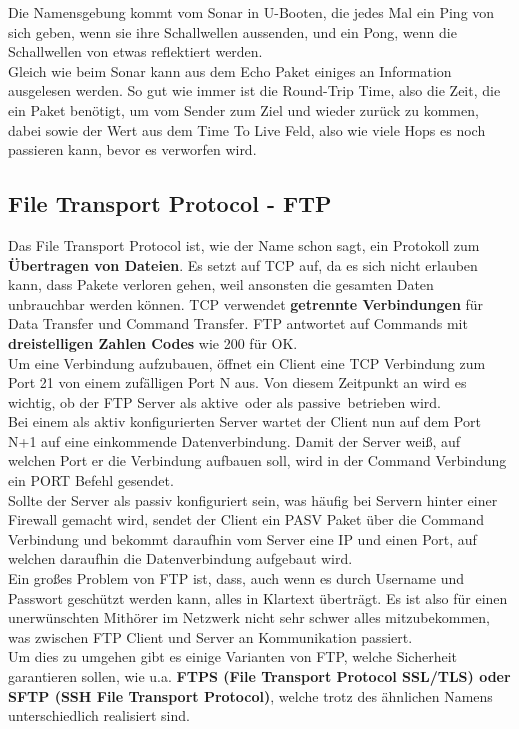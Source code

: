 \documentclass[12pt,a4paper]{report}
\begin{document}
Die Namensgebung kommt vom Sonar in U-Booten, die jedes Mal ein Ping von sich geben, wenn sie ihre Schallwellen aussenden, und ein Pong, wenn die Schallwellen von etwas reflektiert werden.\\ 
Gleich wie beim Sonar kann aus dem Echo Paket einiges an Information ausgelesen werden. So gut wie immer ist die Round-Trip Time, also die Zeit, die ein Paket benötigt, um vom Sender zum Ziel und wieder zurück zu kommen, dabei sowie der Wert aus dem Time To Live Feld, also wie viele Hops es noch passieren kann, bevor es verworfen wird.
\subsection{File Transport Protocol - FTP}
Das File Transport Protocol ist, wie der Name schon sagt, ein Protokoll zum \textbf{Übertragen von Dateien}. Es setzt auf TCP auf, da es sich nicht erlauben kann, dass Pakete verloren gehen, weil ansonsten die gesamten Daten unbrauchbar werden können. TCP verwendet \textbf{getrennte Verbindungen} für Data Transfer und Command Transfer. FTP antwortet auf Commands mit \textbf{dreistelligen Zahlen Codes} wie 200 für OK.\\

Um eine Verbindung aufzubauen, öffnet ein Client eine TCP Verbindung zum Port 21 von einem zufälligen Port N aus. Von diesem Zeitpunkt an wird es wichtig, ob der FTP Server als \glqq aktive\grqq \ oder als \glqq passive\grqq \ betrieben wird.\\
Bei einem als aktiv konfigurierten Server wartet der Client nun auf dem Port N+1 auf eine einkommende Datenverbindung. Damit der Server weiß, auf welchen Port er die Verbindung aufbauen soll, wird in der Command Verbindung ein PORT Befehl gesendet.\\
Sollte der Server als passiv konfiguriert sein, was häufig bei Servern hinter einer Firewall gemacht wird, sendet der Client ein PASV Paket über die Command Verbindung und bekommt daraufhin vom Server eine IP und einen Port, auf welchen daraufhin die Datenverbindung aufgebaut wird.\\

Ein großes Problem von FTP ist, dass, auch wenn es durch Username und Passwort geschützt werden kann, alles in Klartext überträgt. Es ist also für einen unerwünschten Mithörer im Netzwerk nicht sehr schwer alles mitzubekommen, was zwischen FTP Client und Server an Kommunikation passiert.\\
Um dies zu umgehen gibt es einige Varianten von FTP, welche Sicherheit garantieren sollen, wie u.a. \textbf{FTPS (File Transport Protocol SSL/TLS) oder SFTP (SSH File Transport Protocol)}, welche trotz des ähnlichen Namens unterschiedlich realisiert sind. 
 
\end{document}
